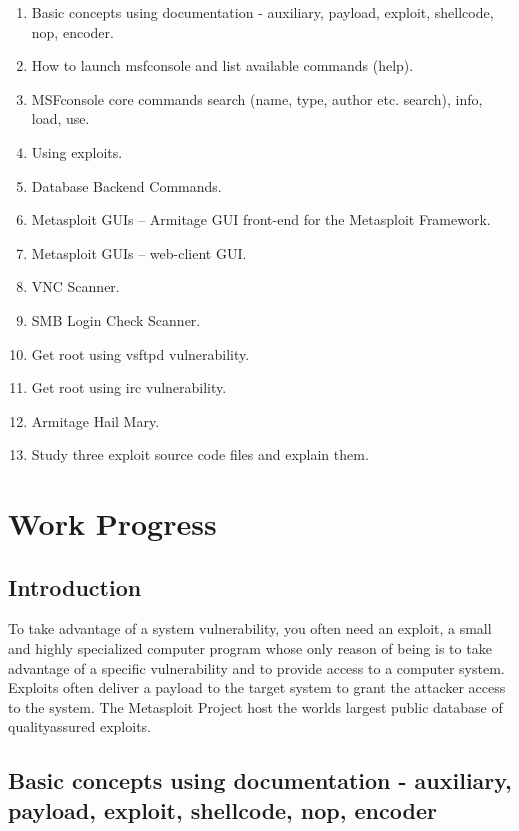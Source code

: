 \documentclass[14pt,a4paper,report]{report}
\begin{document}
\begin{enumerate}
	\item Basic concepts using documentation - auxiliary, payload, exploit, shellcode, nop, encoder.
	\item How to launch msfconsole and list available commands (help).
	\item MSFconsole core commands search (name, type, author etc. search), info, load, use.
	\item Using exploits.
	\item Database Backend Commands.
	\item Metasploit GUIs – Armitage GUI front-end for the Metasploit Framework.
	\item Metasploit GUIs – web-client GUI.
	\item VNC Scanner.
	\item SMB Login Check Scanner.
	\item Get root using vsftpd vulnerability.
	\item Get root using irc vulnerability.
	\item Armitage Hail Mary.
	\item Study three exploit source code files and explain them.
\end{enumerate}

\clearpage

\section{Work Progress}

\subsection{Introduction}

To take advantage of a system vulnerability, you often need an exploit, a small and highly specialized computer program whose only reason of being is to take advantage of a specific vulnerability and to provide access to a computer system. Exploits often deliver a payload to the target system to grant the attacker access to the system. The Metasploit Project host the worlds largest public database of qualityassured exploits.

\subsection{Basic concepts using documentation - auxiliary, payload, exploit, shellcode, nop, encoder}
\end{document}
